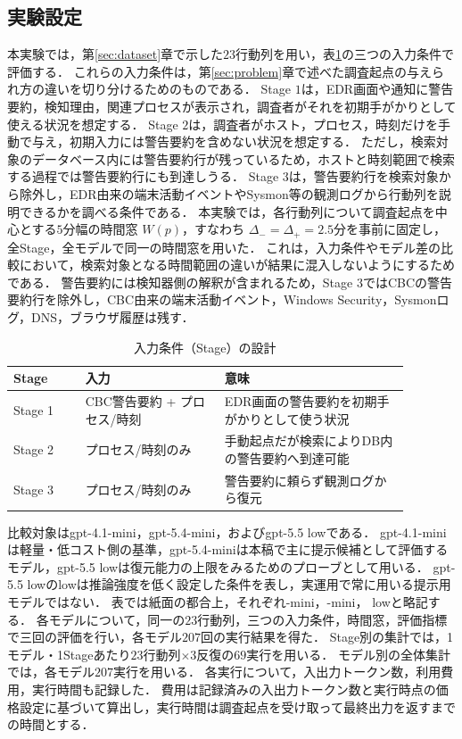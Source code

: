 \documentclass[a4paper,twocolumn,10pt]{article}
\newcommand{\code}[1]{{\small\ttfamily #1}}
\begin{document}
\subsection{実験設定}

本実験では，第\ref{sec:dataset}章で示した\(23\)行動列を用い，表\ref{tab:stage_setting}の三つの入力条件で評価する．
これらの入力条件は，第\ref{sec:problem}章で述べた調査起点の与えられ方の違いを切り分けるためのものである．
Stage \(1\)は，EDR画面や通知に警告要約，検知理由，関連プロセスが表示され，調査者がそれを初期手がかりとして使える状況を想定する．
Stage \(2\)は，調査者がホスト，プロセス，時刻だけを手動で与え，初期入力には警告要約を含めない状況を想定する．
ただし，検索対象のデータベース内には警告要約行が残っているため，ホストと時刻範囲で検索する過程では警告要約行にも到達しうる．
Stage \(3\)は，警告要約行を検索対象から除外し，EDR由来の端末活動イベントやSysmon等の観測ログから行動列を説明できるかを調べる条件である．
本実験では，各行動列について調査起点を中心とする\(5\)分幅の時間窓 \(W(p)\)，すなわち \(\Delta_-=\Delta_+=2.5\)分を事前に固定し，全Stage，全モデルで同一の時間窓を用いた．
これは，入力条件やモデル差の比較において，検索対象となる時間範囲の違いが結果に混入しないようにするためである．
警告要約には検知器側の解釈が含まれるため，Stage \(3\)ではCBCの警告要約行を除外し，CBC由来の端末活動イベント，Windows Security，Sysmonログ，DNS，ブラウザ履歴は残す．

\begin{table}[t]
\centering
\footnotesize
\caption{入力条件（Stage）の設計}
\label{tab:stage_setting}
\setlength{\tabcolsep}{3pt}
\begin{tabular}{p{0.16\linewidth}p{0.31\linewidth}p{0.41\linewidth}}
\toprule
Stage & 入力 & 意味 \\
\midrule
Stage 1 & CBC警告要約 + プロセス/時刻 & EDR画面の警告要約を初期手がかりとして使う状況 \\
Stage 2 & プロセス/時刻のみ & 手動起点だが検索によりDB内の警告要約へ到達可能 \\
Stage 3 & プロセス/時刻のみ & 警告要約に頼らず観測ログから復元 \\
\bottomrule
\end{tabular}
\end{table}

比較対象は\code{gpt-4.1-mini}，\code{gpt-5.4-mini}，および\code{gpt-5.5 low}である．
\code{gpt-4.1-mini}は軽量・低コスト側の基準，\code{gpt-5.4-mini}は本稿で主に提示候補として評価するモデル，\code{gpt-5.5 low}は復元能力の上限をみるためのプローブとして用いる．
\code{gpt-5.5 low}のlowは推論強度を低く設定した条件を表し，実運用で常に用いる提示用モデルではない．
表では紙面の都合上，それぞれ\code{4.1-mini}，\code{5.4-mini}，\code{5.5 low}と略記する．
各モデルについて，同一の\(23\)行動列，三つの入力条件，時間窓，評価指標で三回の評価を行い，各モデル\(207\)回の実行結果を得た．
Stage別の集計では，1モデル・1Stageあたり\(23\)行動列\(\times 3\)反復の\(69\)実行を用いる．
モデル別の全体集計では，各モデル\(207\)実行を用いる．
各実行について，入出力トークン数，利用費用，実行時間も記録した．
費用は記録済みの入出力トークン数と実行時点の価格設定に基づいて算出し，実行時間は調査起点を受け取って最終出力を返すまでの時間とする．
\end{document}
